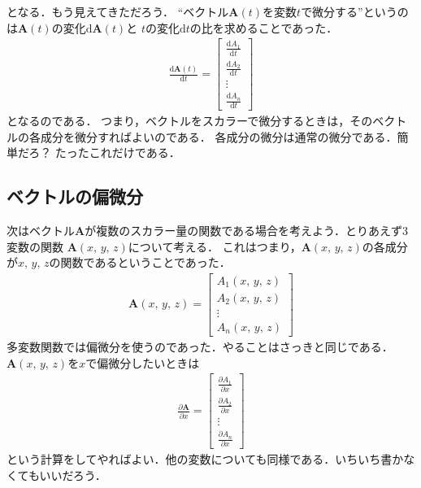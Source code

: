 となる．もう見えてきただろう．
``ベクトル$\bm{A}(t)$を変数$t$で微分する''というのは$\bm{A}(t)$の変化$\mathrm{d}\bm{A}(t)$と
$t$の変化$\mathrm{d}t$の比を求めることであった．
\renewcommand{\arraystretch}{2}
\begin{eqnarray}
\frac{\mathrm{d}\bm{A}(t)}{\mathrm{d}t} = \left[
\begin{array}{c}
\displaystyle 
\frac{\mathrm{d} A_1}{\mathrm{d}t} \\
\displaystyle
\frac{\mathrm{d} A_2}{\mathrm{d}t} \\
\vdots \\
\displaystyle
\frac{\mathrm{d} A_n}{\mathrm{d}t} 
\end{array}
\right]
\label{eq:vectbibun}
\end{eqnarray}
となるのである．
つまり，ベクトルをスカラーで微分するときは，そのベクトルの各成分を微分すればよいのである．
各成分の微分は通常の微分である．簡単だろ？ たったこれだけである．

\subsection{ベクトルの偏微分}
次はベクトル$\bm{A}$が複数のスカラー量の関数である場合を考えよう．とりあえず3変数の関数
$\bm{A}(x, \, y, \, z)$について考える．
これはつまり，$\bm{A}(x, \, y, \, z)$の各成分が$x, \, y, \, z$の関数であるということであった．
\renewcommand{\arraystretch}{1}
\begin{eqnarray}
\bm{A}(x, \, y, \, z) = \left[
\begin{array}{c}
 A_1 (x, \, y, \, z) \\
 A_2 (x, \, y, \, z) \\
 \vdots \\
 A_n (x, \, y, \, z)
 \end{array}
\right]
\label{eq:vecxyz}
\end{eqnarray}
多変数関数では偏微分を使うのであった．やることはさっきと同じである．
$\bm{A}(x, \, y, \, z)$を$x$で偏微分したいときは
\renewcommand{\arraystretch}{2}
\begin{eqnarray}
\frac{\partial \bm{A}}{\partial x} = \left[
\begin{array}{c}
\displaystyle 
\frac{\partial A_1}{\partial x} \\
\displaystyle
\frac{\partial A_2}{\partial x} \\
\vdots \\
\displaystyle
\frac{\partial A_n}{\partial x} 
\end{array}
\right]
\label{eq:vecxhenbibun}
\end{eqnarray}
という計算をしてやればよい．他の変数についても同様である．いちいち書かなくてもいいだろう．
